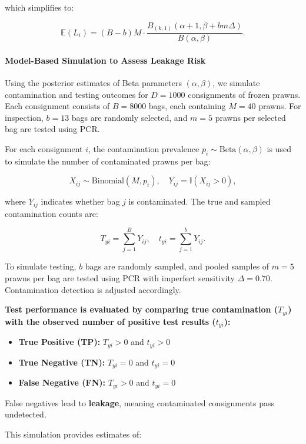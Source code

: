\documentclass[
]{article}
\providecommand{\tightlist}{%
  \setlength{\itemsep}{0pt}\setlength{\parskip}{0pt}}
\begin{document}
which simplifies to:

\[
\mathbb{E}(L_i) = (B - b) M \cdot \frac{B_{(k,1)}(\alpha + 1, \beta + bm\Delta)}{B(\alpha, \beta)}.
\]

\paragraph{Model-Based Simulation to Assess Leakage
Risk}\label{model-based-simulation-to-assess-leakage-risk}

Using the posterior estimates of Beta parameters \((\alpha, \beta)\), we
simulate contamination and testing outcomes for \(D = 1000\)
consignments of frozen prawns. Each consignment consists of \(B = 8000\)
bags, each containing \(M = 40\) prawns. For inspection, \(b = 13\) bags
are randomly selected, and \(m = 5\) prawns per selected bag are tested
using PCR.

For each consignment \(i\), the contamination prevalence
\(p_i \sim \text{Beta}(\alpha, \beta)\) is used to simulate the number
of contaminated prawns per bag:

\[
X_{ij} \sim \text{Binomial}(M, p_i), \quad Y_{ij} = \mathbb{I}(X_{ij} > 0),
\]

where \(Y_{ij}\) indicates whether bag \(j\) is contaminated. The true
and sampled contamination counts are:

\[
T_{yi} = \sum_{j=1}^{B} Y_{ij}, \quad t_{yi} = \sum_{j=1}^{b} Y_{ij}.
\]

To simulate testing, \(b\) bags are randomly sampled, and pooled samples
of \(m = 5\) prawns per bag are tested using PCR with imperfect
sensitivity \(\Delta = 0.70\). Contamination detection is adjusted
accordingly.

\textbf{Test performance is evaluated by comparing true contamination
(\(T_{yi}\)) with the observed number of positive test results
(\(t_{yi}\)):}

\begin{itemize}
\tightlist
\item
  \textbf{True Positive (TP):} \(T_{yi} > 0\) and \(t_{yi} > 0\)
\item
  \textbf{True Negative (TN):} \(T_{yi} = 0\) and \(t_{yi} = 0\)
\item
  \textbf{False Negative (FN):} \(T_{yi} > 0\) and \(t_{yi} = 0\)
\end{itemize}

False negatives lead to \textbf{leakage}, meaning contaminated
consignments pass undetected.

This simulation provides estimates of:
\end{document}

